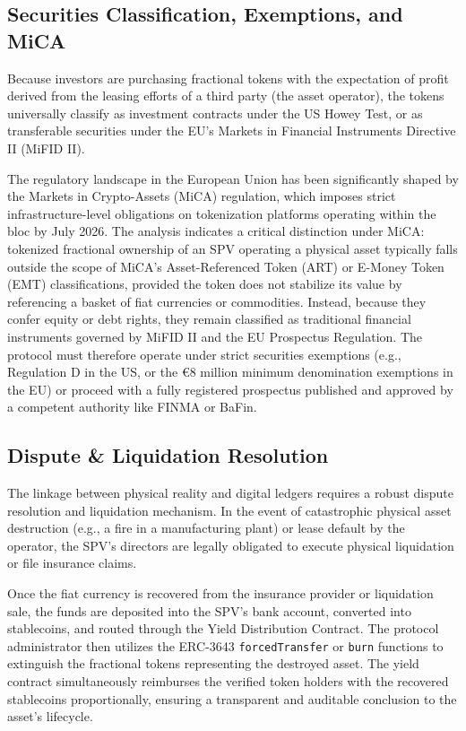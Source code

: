\documentclass{Resources/bdlt-project}
\begin{document}
\subsection{Securities Classification, Exemptions, and MiCA}
Because investors are purchasing fractional tokens with the expectation of profit derived from the leasing efforts of a third party (the asset operator), the tokens universally classify as investment contracts under the US Howey Test, or as transferable securities under the EU's Markets in Financial Instruments Directive II (MiFID II).

The regulatory landscape in the European Union has been significantly shaped by the Markets in Crypto-Assets (MiCA) regulation, which imposes strict infrastructure-level obligations on tokenization platforms operating within the bloc by July 2026. The analysis indicates a critical distinction under MiCA: tokenized fractional ownership of an SPV operating a physical asset typically falls outside the scope of MiCA's Asset-Referenced Token (ART) or E-Money Token (EMT) classifications, provided the token does not stabilize its value by referencing a basket of fiat currencies or commodities. Instead, because they confer equity or debt rights, they remain classified as traditional financial instruments governed by MiFID II and the EU Prospectus Regulation. The protocol must therefore operate under strict securities exemptions (e.g., Regulation D in the US, or the €8 million minimum denomination exemptions in the EU) or proceed with a fully registered prospectus published and approved by a competent authority like FINMA or BaFin.

\subsection{Dispute \& Liquidation Resolution}
The linkage between physical reality and digital ledgers requires a robust dispute resolution and liquidation mechanism. In the event of catastrophic physical asset destruction (e.g., a fire in a manufacturing plant) or lease default by the operator, the SPV's directors are legally obligated to execute physical liquidation or file insurance claims.

Once the fiat currency is recovered from the insurance provider or liquidation sale, the funds are deposited into the SPV's bank account, converted into stablecoins, and routed through the Yield Distribution Contract. The protocol administrator then utilizes the ERC-3643 \texttt{forcedTransfer} or \texttt{burn} functions to extinguish the fractional tokens representing the destroyed asset. The yield contract simultaneously reimburses the verified token holders with the recovered stablecoins proportionally, ensuring a transparent and auditable conclusion to the asset's lifecycle.
\end{document}
